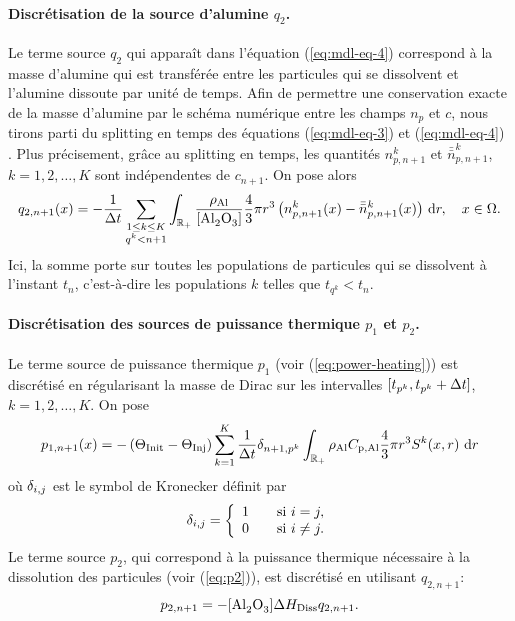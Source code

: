 \paragraph{Discrétisation de la source d'alumine $q_{2}$.}
Le terme source $q_{2}$ qui apparaît dans l'équation
(\ref{eq:mdl-eq-4}) correspond à la masse d'alumine qui est transférée
entre les particules qui se dissolvent et l'alumine dissoute par unité
de temps. Afin de permettre une conservation exacte de la masse d'alumine
par le schéma numérique entre les champs $n_p$ et $c$, nous
tirons parti du splitting en temps des équations (\ref{eq:mdl-eq-3})
et (\ref{eq:mdl-eq-4}) \cite{Hofer2011}. Plus précisement, grâce au
splitting en temps, les quantités $n_{p,n+1}^k$ et $\bar{\bar n}_{p,n+1}^k$, $k = 1, 2, \dots, K$
sont indépendentes de $c_{n+1}$. On pose alors
\begin{equation}\label{eq:q2}
  q_{2,n+1}(x) = -\frac{1}{\dt} \sum_{\substack{1\leq k\leq K\\ q^k < n+1}}
  \int_\rplus
  \frac{\aluminadensity}{[\ce{Al2O3}]} \frac{4}{3}\pi r^3
  \parent{n_{p,n+1}^k(x) - \bar{\bar n}_{p,n+1}^k(x)} \intd{r}, \quad x\in\Omega.
\end{equation}
Ici, la somme porte sur toutes les populations de particules qui se
dissolvent à l'instant $t_n$, c'est-à-dire les populations $k$
telles que $t_{q^k} < t_n$.


\paragraph{Discrétisation des sources de puissance thermique $p_1$ et
$p_2$.} Le terme source de puissance thermique $p_1$ (voir (\ref{eq:power-heating})) est discrétisé
en régularisant la masse de Dirac sur les intervalles $[t_{p^k},
  t_{p^k} + \Delta t]$, $k = 1, 2, \dots, K$. On pose
\begin{equation}\label{eq:p1-discret}
p_{1,n+1}(x) = -\left( \Theta_\text{Init} - \Theta_\text{Inj} \right)\sum_{k = 1}^K
\frac{1}{\Delta t}\delta_{n+1,p^k}\int_{{\mathbb R_+}} \rho_\mathrm{Al}C_{\mathrm{p,Al}}
\frac{4}{3}\pi r^3S^k(x, r)\,\,\mathrm dr
\end{equation}
où $\delta_{i,j}$ est le symbol de Kronecker définit par
\begin{equation}
  \delta_{i,j} = \left\{
  \begin{array}{ll}
    1&\quad\text{si } i = j,\\
    0&\quad\text{si } i\neq j.
  \end{array}\right.
\end{equation}
Le terme source $p_2$, qui correspond à la puissance thermique
nécessaire à la dissolution des particules (voir (\ref{eq:p2})), est
discrétisé en utilisant $q_{2,n+1}$:
\begin{equation}\label{eq:p2-discret}
p_{2,n+1} = -[\cee{Al2O3}]\aluminadissolutionenthalpy q_{2,n+1}.
\end{equation}

